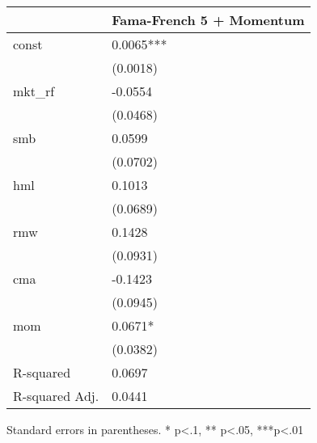 \begin{table}
\caption{}
\label{}
\begin{center}
\begin{tabular}{ll}
\hline
               & Fama-French 5 + Momentum  \\
\hline
const          & 0.0065***                 \\
               & (0.0018)                  \\
mkt\_rf        & -0.0554                   \\
               & (0.0468)                  \\
smb            & 0.0599                    \\
               & (0.0702)                  \\
hml            & 0.1013                    \\
               & (0.0689)                  \\
rmw            & 0.1428                    \\
               & (0.0931)                  \\
cma            & -0.1423                   \\
               & (0.0945)                  \\
mom            & 0.0671*                   \\
               & (0.0382)                  \\
R-squared      & 0.0697                    \\
R-squared Adj. & 0.0441                    \\
\hline
\end{tabular}
\end{center}
\end{table}
\bigskip
Standard errors in parentheses. \newline 
* p<.1, ** p<.05, ***p<.01